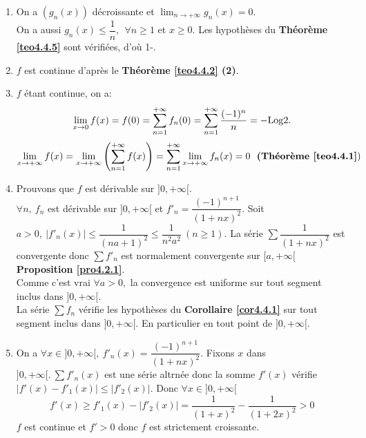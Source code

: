 \documentclass[11pt, a4paper]{book}
\begin{document}
\begin{enumerate}
\item On a $(g_n(x))$ d\'ecroissante et ${\displaystyle \lim_{n\rightarrow+\infty}g_n(x)=0.}$\\ On a aussi $g_n(x)\leq \dfrac{1}{n},~~\forall n\geq1$ et $x\geq0.$ Les hypoth\`eses du \textbf{Th\'eor\`eme \ref{teo4.4.5}} sont v\'erifi\'ees, d'o\`u 1-.
\item $f$ est continue d'apr\`es le \textbf{Th\'eor\`eme \ref{teo4.4.2} (2)}.
\item $f$ \'etant continue, on a: $$\lim_{x\rightarrow0}f(x)=f(0)=\sum_{n=1}^{+\infty}f_n(0)=\sum_{n=1}^{+\infty}\dfrac{(-1)^n}{n}=-\mathrm{Log} 2.$$ $$\lim_{x\rightarrow+\infty}f(x)=\lim_{x\rightarrow+\infty}\left(\sum_{n=1}^{+\infty}f(x)\right)=\sum_{n=1}^{+\infty}\lim_{x\rightarrow+\infty}f_n(x)=0~~\text{\textbf{(Th\'eor\`eme \ref{teo4.4.1}}})$$
\item Prouvons que $f$ est d\'erivable sur $]0,+\infty[.$ \\
$\forall n,~f_n$ est d\'erivable sur $]0,+\infty[$ et $f'_n=\dfrac{(-1)^{n+1}}{(1+nx)^2}.$ Soit $a>0,~|f'_n(x)|\leq \dfrac{1}{(na+1)^2}\leq\dfrac{1}{n^2a^2}~(n\geq1).$ La s\'erie $\sum\dfrac{1}{(1+nx)^2}$ est convergente donc $\sum f'_n$ est normalement convergente sur $[a,+\infty[$ \textbf{Proposition \ref{pro4.2.1}}. \\ Comme c'est vrai $\forall a>0,$ la convergence est uniforme sur tout segment inclus dans $]0,+\infty[.$ \\ La s\'erie $\sum f_n$ v\'erifie les hypoth\`eses du \textbf{Corollaire \ref{cor4.4.1}} sur tout segment inclus dans $]0,+\infty[.$ En particulier en tout point de $]0,+\infty[.$
\item On a $\forall x\in ]0,+\infty[,~f'_n(x)=\dfrac{(-1)^{n+1}}{(1+nx)^2}.$ Fixons $x$ dans $]0,+\infty[.~\sum f'_n(x)$ est une s\'erie altrn\'ee donc la somme $f'(x)$ v\'erifie $|f'(x)-f'_1(x)|\leq |f'_2(x)|.$ Donc $\forall x\in ]0,+\infty[$ $$ f'(x)\geq f'_1(x)-|f'_2(x)|=\dfrac{1}{(1+x)^2}-\dfrac{1}{(1+2x)^2}>0$$
$f$ est continue et $f'>0$ donc $f$ est strictement croissante.
\end{enumerate}
\end{document}
